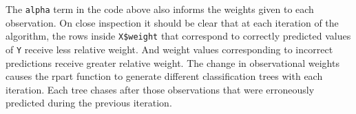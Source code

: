 \documentclass[]{tufte-handout}
\newenvironment{Shaded}{}{}
\newcommand{\KeywordTok}[1]{\textcolor[rgb]{0.00,0.44,0.13}{\textbf{#1}}}
\newcommand{\DecValTok}[1]{\textcolor[rgb]{0.25,0.63,0.44}{#1}}
\newcommand{\FloatTok}[1]{\textcolor[rgb]{0.25,0.63,0.44}{#1}}
\newcommand{\StringTok}[1]{\textcolor[rgb]{0.25,0.44,0.63}{#1}}
\newcommand{\CommentTok}[1]{\textcolor[rgb]{0.38,0.63,0.69}{\textit{#1}}}
\newcommand{\OperatorTok}[1]{\textcolor[rgb]{0.40,0.40,0.40}{#1}}
\newcommand{\NormalTok}[1]{#1}
\begin{document}
\begin{Shaded}
\end{Shaded}

The \texttt{alpha} term in the code above also informs the weights given
to each observation. On close inspection it should be clear that at each
iteration of the algorithm, the rows inside \texttt{X\$weight} that
correspond to correctly predicted values of \texttt{Y} receive less
relative weight. And weight values corresponding to incorrect
predictions receive greater relative weight. The change in observational
weights causes the rpart function to generate different classification
trees with each iteration. Each tree chases after those observations
that were erroneously predicted during the previous iteration.
\end{document}
